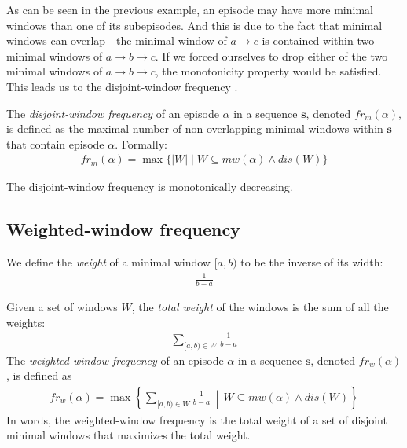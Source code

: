 
As can be seen in the previous example, an episode may have more minimal windows than one of its subepisodes. And this is due to the fact that minimal windows can overlap---the minimal window of $ a \to c $ is contained within two minimal windows of $ a \to b \to c $. If we forced ourselves to drop either of the two minimal windows of $ a \to b \to c $, the monotonicity property would be satisfied. This leads us to the disjoint-window frequency \citep{laxman2005discovering}.

\begin{definition}
The \emph{disjoint-window frequency} of an episode $ \alpha $ in a sequence $ \boldsymbol{s} $, denoted $ fr_m(\alpha) $, is defined as the maximal number of non-overlapping minimal windows within $ \boldsymbol{s} $ that contain episode $ \alpha $. Formally:
\begin{align*}
fr_m(\alpha) = \max\{ | W | \mid W \subseteq mw(\alpha) \wedge dis(W) \}
\end{align*}
\end{definition}

The disjoint-window frequency is monotonically decreasing.



\subsection{Weighted-window frequency}

\begin{definition}
We define the \emph{weight} of a minimal window $ [a, b) $ to be the inverse of its width:
\begin{align*}
\frac1{b - a}
\end{align*}

Given a set of windows $ W $, the \emph{total weight} of the windows is the sum of all the weights:
\begin{align*}
\sum_{[a,b) \in W} \frac1{b - a}
\end{align*}
The \emph{weighted-window frequency} \cite{cule2014marbles} of an episode $ \alpha $ in a sequence $ \boldsymbol{s} $, denoted $ fr_w(\alpha) $, is defined as
\begin{align*}
fr_w(\alpha) = \max \left\{ \sum_{[a, b) \in W}{\frac{1}{b - a}} \,\middle\vert\, W \subseteq mw(\alpha) \wedge dis(W) \right \}
\end{align*}
In words, the weighted-window frequency is the total weight of a set of disjoint minimal windows that maximizes the total weight.
\end{definition}

